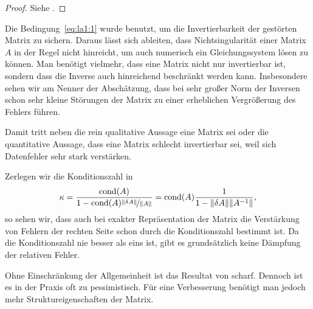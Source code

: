 \begin{proof}
  Siehe \cite[Satz 4.1]{Rannacher17}.
\end{proof}

\begin{remark}
  Die Bedingung~\eqref{eq:la1:1} wurde benutzt, um die
  Invertierbarkeit der gestörten Matrix zu sichern. Daraus lässt sich
  ableiten, dass Nichtsingularität einer Matrix $A$ in der Regel nicht
  hinreicht, um auch numerisch ein Gleichungssystem lösen zu
  können. Man benötigt vielmehr, dass eine Matrix nicht nur
  invertierbar ist, sondern dass die Inverse auch hinreichend
  beschränkt werden kann. Insbesondere sehen wir am Nenner der
  Abschätzung, dass bei sehr großer Norm der Inversen schon sehr
  kleine Störungen der Matrix zu einer erheblichen Vergrößerung des
  Fehlers führen.

  Damit tritt neben die rein qualitative Aussage eine Matrix sei
   oder  die quantitative
  Aussage, dass eine Matrix schlecht invertierbar sei, weil sich
  Datenfehler sehr stark verstärken.

  Zerlegen wir die Konditionszahl in
  \begin{gather}
    \kappa = \frac{\operatorname{cond}(A)}{1-\operatorname{cond}(A)\nicefrac{\lVert\delta A\rVert}{\lVert A\rVert}}
    =\operatorname{cond}(A)\frac{1}{1-\lVert\delta A\rVert{\lVert A^{-1}\rVert}},
  \end{gather}
  so sehen wir, dass auch bei exakter Repräsentation der Matrix die
  Verstärkung von Fehlern der rechten Seite schon durch die
  Konditionszahl bestimmt ist. Da die Konditionszahl nie besser als
  eins ist, gibt es grundsätzlich keine Dämpfung der relativen Fehler.
\end{remark}

\begin{remark}
  Ohne Einschränkung der Allgemeinheit ist das Resultat von
   scharf. Dennoch ist es in der Praxis
  oft zu pessimistisch. Für eine Verbesserung benötigt man jedoch mehr
  Struktureigenschaften der Matrix.
\end{remark}



